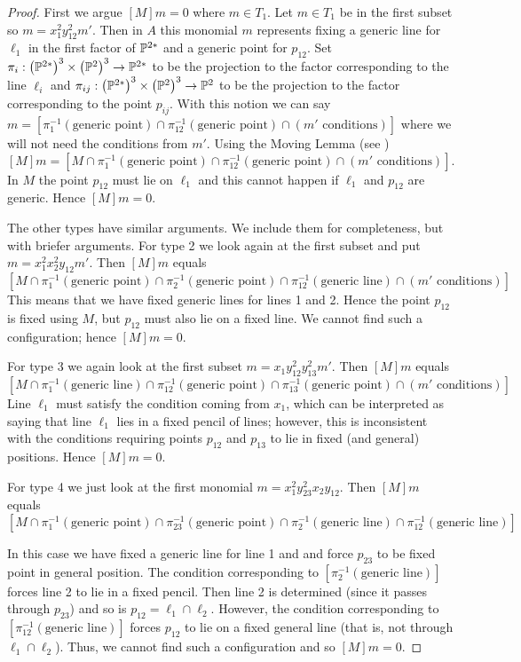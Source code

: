 \documentclass[12pt]{article}
\theoremstyle{plain}
\theoremstyle{definition}
\renewcommand{\P}{\ensuremath \mathbb{P}}
\begin{document}
\begin{proof}
First we argue $[M]m=0$ where $m\in T_1$. Let $m\in T_1$ be in the first subset so $m=x_1^2y_{12}^2m'$. Then in $A$ this monomial $m$ represents fixing a generic line for $\ell_1$ in the first factor of $\P^{2*}$ and a generic point for $p_{12}$. Set $\pi_i : \left( \P^{2*}\right)^3 \times \left( \P^2 \right)^3\to \P^{2*}$ to be the projection to the factor corresponding to the line $\ell_i$ and $\pi_{ij} : \left( \P^{2*}\right)^3 \times \left( \P^2 \right)^3\to \P^{2}$ to be the projection to the factor corresponding to the point $p_{ij}$. With this notion we can say $m=[\pi_{1}^{-1}(\text{generic point}) \cap \pi_{12}^{-1}(\text{generic point})\cap (m' \text{ conditions})]$ where we will not need the conditions from $m'$. Using the Moving Lemma (see \cite[Theorem 5.4]{EH}) $$[M]m=[M\cap \pi_{1}^{-1}(\text{generic point}) \cap \pi_{12}^{-1}(\text{generic point})\cap (m' \text{ conditions})] .$$ In $M$ the point $p_{12}$ must lie on $\ell_1$ and this cannot happen if $\ell_1$ and $p_{12}$ are generic. Hence $[M]m=0.$

The other types have similar arguments. We include them for completeness, but with briefer arguments. For type 2 we look again at the first subset and put $m=x_1^2x_2^2y_{12}m'$. Then $[M]m$ equals $$[M \cap \pi_{1}^{-1}(\text{generic point})\cap \pi_{2}^{-1}(\text{generic point}) \cap \pi_{12}^{-1}(\text{generic line})\cap (m' \text{ conditions})].$$ This means that we have fixed generic lines for lines 1 and 2. Hence the point $p_{12}$ is fixed using $M$, but $p_{12}$ must also lie on a fixed line. We cannot find such a configuration; hence $[M]m=0$.

For type 3 we again look at the first subset $m=x_1y_{12}^2y_{13}^2m'$. Then $[M]m$ equals $$[M \cap \pi_{1}^{-1}(\text{generic line})\cap \pi_{12}^{-1}(\text{generic point})\cap \pi_{13}^{-1}(\text{generic point})\cap (m' \text{ conditions})].$$  Line $\ell_1$ must satisfy the condition coming from $x_1$, which can be interpreted as saying that line $\ell_1$ lies in a fixed pencil of lines; however, this is inconsistent with the conditions requiring points $p_{12}$ and $p_{13}$ to lie in fixed (and general) positions. Hence $[M]m=0$.

For type 4 we just look at the first monomial $m= x_1^2y_{23}^2x_2y_{12}$. Then $[M]m$ equals $$[M \cap \pi_{1}^{-1}(\text{generic point})\cap \pi_{23}^{-1}(\text{generic point})\cap \pi_{2}^{-1}(\text{generic line})\cap \pi_{12}^{-1}(\text{generic line})].$$ 

In this case we have fixed a generic line for line 1 and and force $p_{23}$ to be fixed point in general position. The condition corresponding to $[\pi^{-1}_2(\text{generic line})]$ forces line 2 to lie in a fixed pencil. Then line 2 is determined (since it passes through $p_{23}$) and so is $p_{12} = \ell_1 \cap \ell_2$. However, the condition corresponding to $[\pi^{-1}_{12}(\text{generic line})]$ forces $p_{12}$ to lie on a fixed general line (that is, not through $\ell_1 \cap \ell_2$). Thus, we cannot find such a configuration and so $[M]m=0$.


\end{proof}
\end{document}

